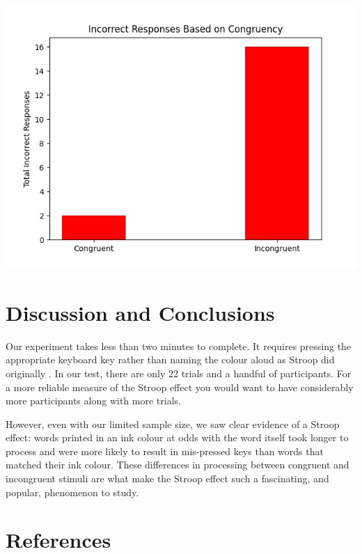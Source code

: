 \documentclass{article}
\begin{document}
\begin{center}
\includegraphics[width=.9\linewidth]{StroopPlotIncorrect.jpg}
\end{center}

\pagebreak



\section{Discussion and Conclusions}
\label{sec:org903df9c}

Our experiment takes less than two minutes to complete. It requires pressing the appropriate keyboard key rather than naming the colour aloud as Stroop did originally \cite{Stroop1935}. In our test, there are only 22 trials and a handful  of participants. For a more reliable measure of the Stroop effect you would want to have considerably more participants along with more trials.

However, even with our limited sample size, we saw clear evidence of a Stroop effect: words printed in an ink colour at odds with the word itself took longer to process and were more likely to result in mis-pressed keys than words that matched their ink colour. These differences in processing between congruent and incongruent stimuli are what make the Stroop effect such a fascinating, and popular, phenomenon to study.


\section{References}
\label{sec:org6f05b6f}


\end{document}
